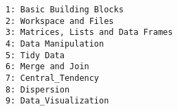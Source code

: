 \documentclass[12pt,article]{article}
\begin{document}
\large
\begin{verbatim}
1: Basic Building Blocks
2: Workspace and Files
3: Matrices, Lists and Data Frames
4: Data Manipulation
5: Tidy Data
6: Merge and Join
7: Central_Tendency
8: Dispersion
9: Data_Visualization
\end{verbatim}
\end{document}
